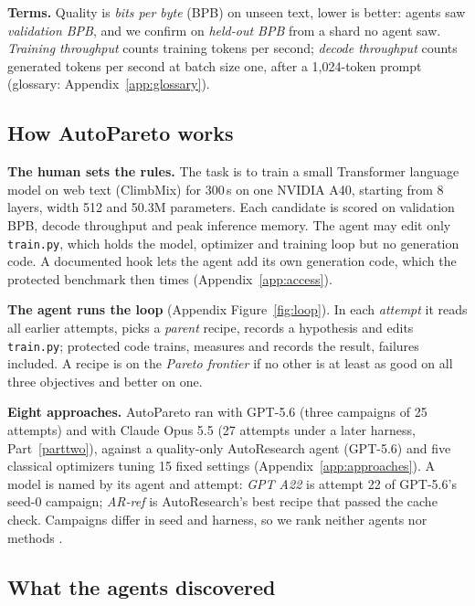 \documentclass{article}
\begin{document}
 \textbf{Terms.} Quality is \emph{bits per byte} (BPB) on unseen text, lower is better: agents saw \emph{validation BPB}, and we confirm on \emph{held-out BPB} from a shard no agent saw. \emph{Training throughput} counts training tokens per second; \emph{decode throughput} counts generated tokens per second at batch size one, after a 1{,}024-token prompt (glossary: Appendix~\ref{app:glossary}).

\subsection{How AutoPareto works}\label{sec:brief}
 \textbf{The human sets the rules.} The task is to train a small Transformer language model on web text (ClimbMix) for 300\,s on one NVIDIA A40, starting from 8 layers, width 512 and 50.3M parameters. Each candidate is scored on validation BPB, decode throughput and peak inference memory. The agent may edit only \texttt{train.py}, which holds the model, optimizer and training loop but no generation code. A documented hook lets the agent add its own generation code, which the protected benchmark then times (Appendix~\ref{app:access}).

 \textbf{The agent runs the loop} (Appendix Figure~\ref{fig:loop}). In each \emph{attempt} it reads all earlier attempts, picks a \emph{parent} recipe, records a hypothesis and edits \texttt{train.py}; protected code trains, measures and records the result, failures included. A recipe is on the \emph{Pareto frontier} if no other is at least as good on all three objectives and better on one.

 \textbf{Eight approaches.} AutoPareto ran with GPT-5.6 (three campaigns of 25 attempts) and with Claude Opus 5.5 (27 attempts under a later harness, Part~\ref{parttwo}), against a quality-only AutoResearch agent (GPT-5.6) and five classical optimizers tuning 15 fixed settings (Appendix~\ref{app:approaches}). A model is named by its agent and attempt: \emph{GPT A22} is attempt 22 of GPT-5.6's seed-0 campaign; \emph{AR-ref} is AutoResearch's best recipe that passed the cache check. Campaigns differ in seed and harness, so we rank neither agents nor methods \citep[cf.][]{ferreira}.

\subsection{What the agents discovered}\label{sec:discover}
\end{document}
